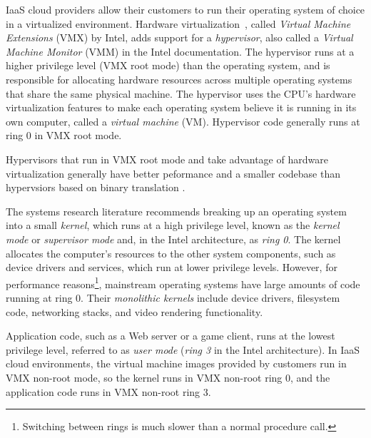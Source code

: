 IaaS cloud providers allow their customers to run their operating system of
choice in a virtualized environment. Hardware
virtualization~\cite{uhlig2005vmx}, called \textit{Virtual Machine Extensions}
(VMX) by Intel, adds support for a \textit{hypervisor}, also called a
\textit{Virtual Machine Monitor} (VMM) in the Intel documentation. The
hypervisor runs at a higher privilege level (VMX root mode) than the operating
system, and is responsible for allocating hardware resources across multiple
operating systems that share the same physical machine. The hypervisor uses the
CPU's hardware virtualization features to make each operating system believe it
is running in its own computer, called a \textit{virtual machine} (VM).
Hypervisor code generally runs at ring 0 in VMX root mode.

Hypervisors that run in VMX root mode and take advantage of hardware
virtualization generally have better peformance and a smaller codebase than
hypervsiors based on binary translation \cite{rosenblum2005virtualization}.

The systems research literature recommends breaking up an operating system into
a small \textit{kernel}, which runs at a high privilege level, known as the
\textit{kernel mode} or \textit{supervisor mode} and, in the Intel
architecture, as \textit{ring 0}. The kernel allocates the computer's resources
to the other system components, such as device drivers and services, which run
at lower privilege levels. However, for performance reasons\footnote{Switching
between rings is much slower than a normal procedure call.}, mainstream
operating systems have large amounts of code running at ring 0. Their
\textit{monolithic kernels} include device drivers, filesystem code, networking
stacks, and video rendering functionality.

Application code, such as a Web server or a game client, runs at the lowest
privilege level, referred to as \textit{user mode} (\textit{ring 3} in the
Intel architecture). In IaaS cloud environments, the virtual machine images
provided by customers run in VMX non-root mode, so the kernel runs in VMX
non-root ring 0, and the application code runs in VMX non-root ring 3.
